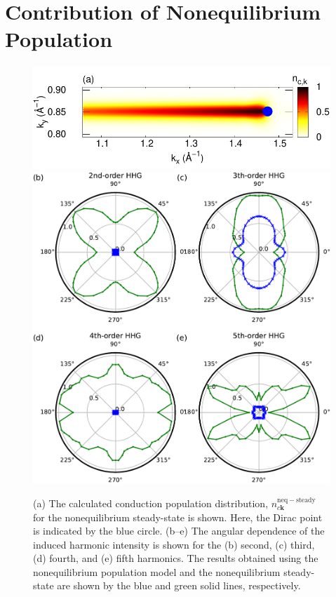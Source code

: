 \section{Contribution of Nonequilibrium Population}
\begin{figure}[htp]
	\center
	\includegraphics[width=0.8\linewidth]{pic/pop_dist.pdf}
	\includegraphics[width=0.8\linewidth]{pic/pop_c.pdf}
	\caption{\label{fig:pop}
		(a) The calculated conduction population distribution, $n^{\mathrm{neq-steady}}_{c\mathbf k}$ for the nonequilibrium steady-state is shown. Here, the Dirac point is indicated by the blue circle. (b--e) The angular dependence of the induced harmonic intensity is shown for the (b) second, (c) third, (d) fourth, and (e) fifth harmonics. The results obtained using the nonequilibrium population model and the nonequilibrium steady-state are shown by the blue and green solid lines, respectively.
	}
\end{figure}

